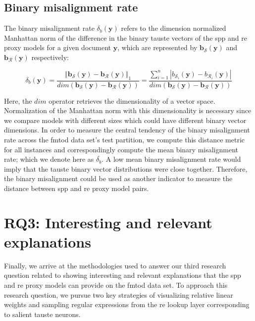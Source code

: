 \subsection{Binary misalignment rate}

The binary misalignment rate $\delta_b(\bm{y})$ refers to the dimension
normalized Manhattan norm of the difference in the binary \ac{tauste} vectors of the
\ac{spp} and \ac{re} proxy models for a given document $\bm{y}$, which are represented
by $\bm{b_{\mathcal{S}}}(\bm{y})$ and $\bm{b_{\mathcal{R}}}(\bm{y})$
respectively:

\begin{equation}
  \delta_b(\bm{y}) = \dfrac{\left\Vert \bm{b_{\mathcal{S}}}(\bm{y}) - \bm{b_{\mathcal{R}}}(\bm{y}) \right\Vert_{1}}{dim(\bm{b_{\mathcal{S}}}(\bm{y}) - \bm{b_{\mathcal{R}}}(\bm{y}))} = \dfrac{\sum^n_{i=1} |b_{\mathcal{S}_i}(\bm{y}) - b_{\mathcal{R}_i}(\bm{y})|}{{dim(\bm{b_{\mathcal{S}}}(\bm{y}) - \bm{b_{\mathcal{R}}}(\bm{y}))}}
\end{equation}

Here, the $dim$ operator retrieves the dimensionality of a vector space.
Normalization of the Manhattan norm with this dimensionality is necessary since
we compare models with different sizes which could have different binary vector
dimensions. In order to measure the central tendency of the binary misalignment
rate across the \ac{fmtod} data set's test partition, we compute this distance metric
for all instances and correspondingly compute the mean binary misalignment rate;
which we denote here as $\overline{\delta_b}$. A low mean binary misalignment
rate would imply that the \ac{tauste} binary vector distributions were close
together. Therefore, the binary misalignment could be used as another indicator
to measure the distance between \ac{spp} and \ac{re} proxy model pairs.

\section{RQ3: Interesting and relevant explanations}

Finally, we arrive at the methodologies used to answer our third research
question related to showing interesting and relevant explanations that the
\ac{spp} and \ac{re} proxy models can provide on the \ac{fmtod} data set. To
approach this research question, we pursue two key strategies of visualizing
relative linear weights and sampling regular expressions from the \ac{re} lookup
layer corresponding to salient \ac{tauste} neurons.


